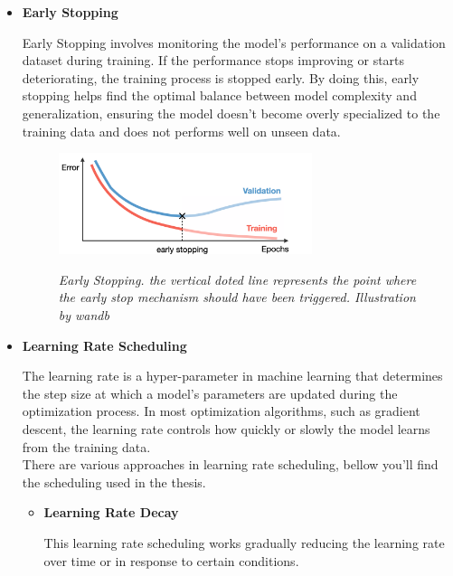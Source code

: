 \begin{itemize}
  \item \textbf{Early Stopping}

Early Stopping involves monitoring the model's performance on a validation dataset during training. If the performance stops improving or starts deteriorating, the training process is stopped early. By doing this, early stopping helps find the optimal balance between model complexity and generalization, ensuring the model doesn't become overly specialized to the training data and does not performs well on unseen data. \\

\begin{figure}[H]
\centering
\includegraphics[width=0.7\textwidth]{imatges/preliminaries/early-stop.png}
\caption[Early Stopping]{\textit{Early Stopping. the vertical doted line represents the point where the early stop mechanism should have been triggered. Illustration by wandb}}
{\label{fig:early-stop}}
\end{figure}

\item \textbf{Learning Rate Scheduling}

The learning rate is a hyper-parameter in machine learning that determines the step size at which a model's parameters are updated during the optimization process. In most optimization algorithms, such as gradient descent, the learning rate controls how quickly or slowly the model learns from the training data. \\

There are various approaches in learning rate scheduling, bellow you'll find the scheduling used in the thesis.



\begin{itemize}
    \item \textbf{Learning Rate Decay}

    This learning rate scheduling works gradually reducing
    the learning rate over time or in response to certain conditions. \\


\end{itemize}
\end{itemize}
